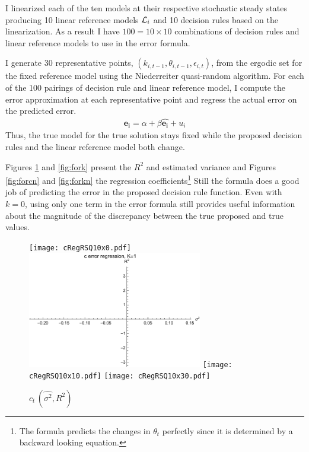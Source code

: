 \documentclass[12pt]{article}
\begin{document}
\vspace{.2in}



I linearized each of the ten models at their respective stochastic steady
states producing 10 linear reference models ${\mathcal{L}}_i$ and 10 decision rules
based on the linearization. 
As a result I have $100=10 \times 10$ combinations of decision rules and
linear reference models to use in the error formula.


I generate 30 representative points, $(k_{i,t-1},\theta_{i,t-1},\epsilon_{i,t})$, from the ergodic set for the fixed reference model
using the Niederreiter quasi-random algorithm.
For each of the 100 pairings of decision rule and linear reference model,
I compute the error approximation at each representative point 
and regress the actual error on the predicted error.
\begin{gather*}
  \mathbf{e_i}=\alpha + \beta   \hat{\mathbf{e_i}} +u_i
\end{gather*}
Thus, the  true model for the true solution stays 
fixed while the proposed
decision rules and the linear reference model  both change.

Figures \ref{fig:forc} and \ref{fig:fork}  present the $R^2$ and estimated variance and Figures \ref{fig:forcn} and \ref{fig:forkn} the regression coefficients\footnote{The formula predicts the changes 
in $\theta_t$ perfectly since it is determined by a backward looking equation.}
Still the formula does a good job of predicting the error in the 
proposed decision rule function.
Even with $k=0$, using only one term in the error formula still provides 
useful information about the magnitude of the discrepancy between the 
true proposed and true values.



\begin{figure}
  \centering
  \texttt{[image: cRegRSQ10x0.pdf]}
  \includegraphics[width=3.0in]{cRegRSQ10x1.pdf}
  \texttt{[image: cRegRSQ10x10.pdf]}
  \texttt{[image: cRegRSQ10x30.pdf]}
  \caption{$c_t\, (\hat{\sigma^2},R^2)$ \label{fig:forc}}
  
\end{figure}
\end{document}
